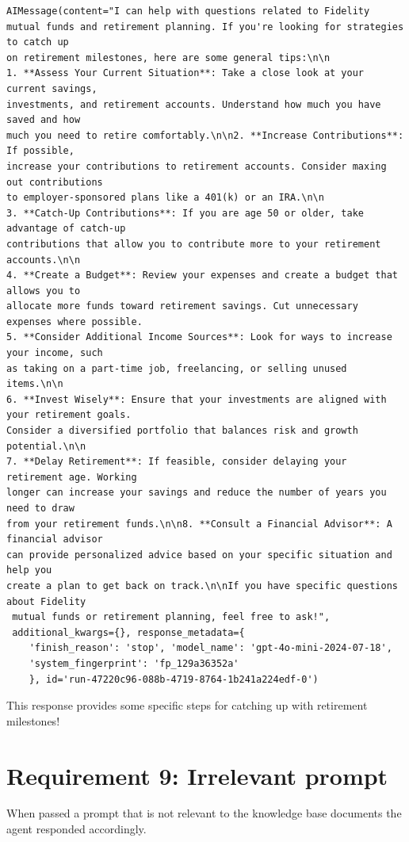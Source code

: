 \documentclass[11pt,letterpaper]{article}
\begin{document}
\begin{small}
\begin{verbatim}
AIMessage(content="I can help with questions related to Fidelity 
mutual funds and retirement planning. If you're looking for strategies to catch up 
on retirement milestones, here are some general tips:\n\n
1. **Assess Your Current Situation**: Take a close look at your current savings, 
investments, and retirement accounts. Understand how much you have saved and how 
much you need to retire comfortably.\n\n2. **Increase Contributions**: If possible, 
increase your contributions to retirement accounts. Consider maxing out contributions 
to employer-sponsored plans like a 401(k) or an IRA.\n\n
3. **Catch-Up Contributions**: If you are age 50 or older, take advantage of catch-up 
contributions that allow you to contribute more to your retirement accounts.\n\n
4. **Create a Budget**: Review your expenses and create a budget that allows you to 
allocate more funds toward retirement savings. Cut unnecessary expenses where possible.
5. **Consider Additional Income Sources**: Look for ways to increase your income, such 
as taking on a part-time job, freelancing, or selling unused items.\n\n
6. **Invest Wisely**: Ensure that your investments are aligned with your retirement goals. 
Consider a diversified portfolio that balances risk and growth potential.\n\n
7. **Delay Retirement**: If feasible, consider delaying your retirement age. Working 
longer can increase your savings and reduce the number of years you need to draw 
from your retirement funds.\n\n8. **Consult a Financial Advisor**: A financial advisor 
can provide personalized advice based on your specific situation and help you 
create a plan to get back on track.\n\nIf you have specific questions about Fidelity
 mutual funds or retirement planning, feel free to ask!", 
 additional_kwargs={}, response_metadata={
    'finish_reason': 'stop', 'model_name': 'gpt-4o-mini-2024-07-18', 
    'system_fingerprint': 'fp_129a36352a'
    }, id='run-47220c96-088b-4719-8764-1b241a224edf-0')
\end{verbatim}
\end{small}

This response provides some specific steps for catching up with retirement milestones!

\section*{Requirement 9: Irrelevant prompt}
\tab When passed a prompt that is not relevant to the knowledge base documents the agent responded accordingly.
\end{document}
